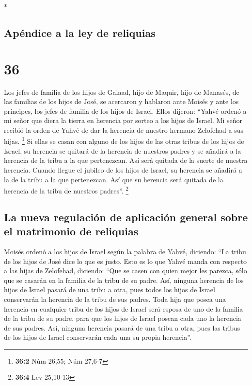 \begin{paracol}{2}
\begin{otherlanguage}{english}
\end{otherlanguage}

\switchcolumn[0]*

\hypertarget{apuxe9ndice-a-la-ley-de-reliquias}{%
\subsection{Apéndice a la ley de
reliquias}\label{apuxe9ndice-a-la-ley-de-reliquias}}

\hypertarget{section-70}{%
\section{36}\label{section-70}}

 Los jefes de familia de los hijos de Galaad, hijo de
Maquir, hijo de Manasés, de las familias de los hijos de José, se
acercaron y hablaron ante Moisés y ante los príncipes, los jefes de
familia de los hijos de Israel.  Ellos dijeron: ``Yahvé
ordenó a mi señor que diera la tierra en herencia por sorteo a los hijos
de Israel. Mi señor recibió la orden de Yahvé de dar la herencia de
nuestro hermano Zelofehad a sus hijas. \footnote{\textbf{36:2} Núm
  26,55; Núm 27,6-7}  Si ellas se casan con alguno de los
hijos de las otras tribus de los hijos de Israel, su herencia se quitará
de la herencia de nuestros padres y se añadirá a la herencia de la tribu
a la que pertenezcan. Así será quitada de la suerte de nuestra herencia.
 Cuando llegue el jubileo de los hijos de Israel, su
herencia se añadirá a la de la tribu a la que pertenezcan. Así que su
herencia será quitada de la herencia de la tribu de nuestros padres''.
\footnote{\textbf{36:4} Lev 25,10-13}

\hypertarget{la-nueva-regulaciuxf3n-de-aplicaciuxf3n-general-sobre-el-matrimonio-de-reliquias}{%
\subsection{La nueva regulación de aplicación general sobre el
matrimonio de
reliquias}\label{la-nueva-regulaciuxf3n-de-aplicaciuxf3n-general-sobre-el-matrimonio-de-reliquias}}

 Moisés ordenó a los hijos de Israel según la palabra de
Yahvé, diciendo: ``La tribu de los hijos de José dice lo que es justo.
 Esto es lo que Yahvé manda con respecto a las hijas de
Zelofehad, diciendo: ``Que se casen con quien mejor les parezca, sólo
que se casarán en la familia de la tribu de su padre. 
Así, ninguna herencia de los hijos de Israel pasará de una tribu a otra,
pues todos los hijos de Israel conservarán la herencia de la tribu de
sus padres.  Toda hija que posea una herencia en cualquier
tribu de los hijos de Israel será esposa de uno de la familia de la
tribu de su padre, para que los hijos de Israel posean cada uno la
herencia de sus padres.  Así, ninguna herencia pasará de
una tribu a otra, pues las tribus de los hijos de Israel conservarán
cada una su propia herencia''.


\end{paracol}
